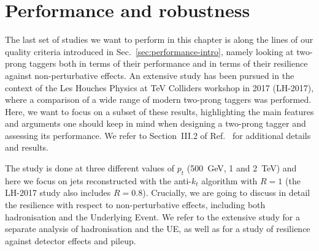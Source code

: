 \section{Performance and robustness}\label{sec:2prongs-perf-robustness}

The last set of studies we want to perform in this chapter is along
the lines of our quality criteria introduced in
Sec.~\ref{sec:performance-intro}, namely looking at two-prong
taggers both in terms of their performance and in terms of their
resilience against non-perturbative effects.
%
An extensive study has been pursued in the context of the Les Houches
Physics at TeV Colliders workshop in 2017 (LH-2017), where a
comparison of a wide range of modern two-prong taggers was
performed. Here, we want to focus on a subset of these results,
highlighting the main features and arguments one should keep in mind
when designing a two-prong tagger and assessing its performance. We
refer to Section~III.2 of Ref.~\cite{Bendavid:2018nar} for additional
details and results.

The study is done at three different values of $p_t$ (500~GeV, 1 and
2~TeV) and here we focus on jets reconstructed with the anti-$k_t$
algorithm with $R=1$ (the LH-2017 study also includes $R=0.8$).
%
Crucially, we are going to discuss in detail the resilience with respect to
non-perturbative effects, including both hadronisation and the
Underlying Event. We refer to the extensive study for a separate
analysis of hadronisation and the UE, as well as for a study of
resilience against detector effects and pileup.

